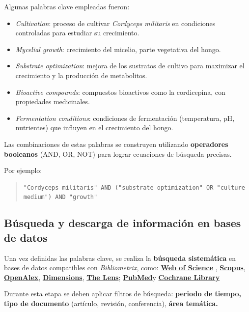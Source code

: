 \documentclass[
  spanish,
  letterpaper,
  DIV=11,
  numbers=noendperiod]{scrreprt}
\begin{document}
Algunas palabras clave empleadas fueron:

\begin{itemize}
\item
  \emph{Cultivation}: proceso de cultivar \emph{Cordyceps militaris} en
  condiciones controladas para estudiar su crecimiento.
\item
  \emph{Mycelial growth}: crecimiento del micelio, parte vegetativa del
  hongo.
\item
  \emph{Substrate optimization}: mejora de los sustratos de cultivo para
  maximizar el crecimiento y la producción de metabolitos.
\item
  \emph{Bioactive compounds}: compuestos bioactivos como la cordicepina,
  con propiedades medicinales.
\item
  \emph{Fermentation conditions}: condiciones de fermentación
  (temperatura, pH, nutrientes) que influyen en el crecimiento del
  hongo.
\end{itemize}

Las combinaciones de estas palabras se construyen utilizando
\textbf{operadores booleanos} (AND, OR, NOT) para lograr ecuaciones de
búsqueda precisas.

Por ejemplo:

\begin{quote}
\texttt{"Cordyceps\ militaris"\ AND\ ("substrate\ optimization"\ OR\ "culture\ medium")\ AND\ "growth"}
\end{quote}

\subsection{Búsqueda y descarga de información en bases de
datos}\label{buxfasqueda-y-descarga-de-informaciuxf3n-en-bases-de-datos}

Una vez definidas las palabras clave, se realiza la \textbf{búsqueda
sistemática} en bases de datos compatibles con \emph{Bibliometrix},
como: \href{www.webofscience.com}{\textbf{Web of Science}} ,
\href{www.scopus.com}{\textbf{Scopus}},
\href{www.openalex.org}{\textbf{OpenAlex}},
\href{www.dimensions.ai}{\textbf{Dimensions}},
\href{www.lens.org}{\textbf{The Lens}};
\href{https://pubmed.ncbi.nlm.nih.gov/}{\textbf{PubMed}}y
\href{www.cochranelibrary.com}{\textbf{Cochrane Library}}

Durante esta etapa se deben aplicar filtros de búsqueda: \textbf{periodo
de tiempo, tipo de documento} (artículo, revisión, conferencia),
\textbf{área temática.}
\end{document}
